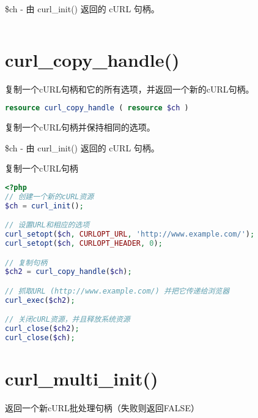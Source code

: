 \begin{compactitem}
\item \$ch - 由 curl\_init() 返回的 cURL 句柄。
\end{compactitem}




\begin{lstlisting}[language=PHP]

\end{lstlisting}

\section{curl\_copy\_handle()}

复制一个cURL句柄和它的所有选项，并返回一个新的cURL句柄。




\begin{lstlisting}[language=PHP]
resource curl_copy_handle ( resource $ch )
\end{lstlisting}

复制一个cURL句柄并保持相同的选项。


\begin{compactitem}
\item \$ch - 由 curl\_init() 返回的 cURL 句柄。
\end{compactitem}



\begin{example}
复制一个cURL句柄
\begin{lstlisting}[language=PHP]
<?php
// 创建一个新的cURL资源
$ch = curl_init();

// 设置URL和相应的选项
curl_setopt($ch, CURLOPT_URL, 'http://www.example.com/');
curl_setopt($ch, CURLOPT_HEADER, 0);

// 复制句柄
$ch2 = curl_copy_handle($ch);

// 抓取URL (http://www.example.com/) 并把它传递给浏览器
curl_exec($ch2);

// 关闭cURL资源，并且释放系统资源
curl_close($ch2);
curl_close($ch);
\end{lstlisting}
\end{example}



\section{curl\_multi\_init()}

返回一个新cURL批处理句柄（失败则返回FALSE）

